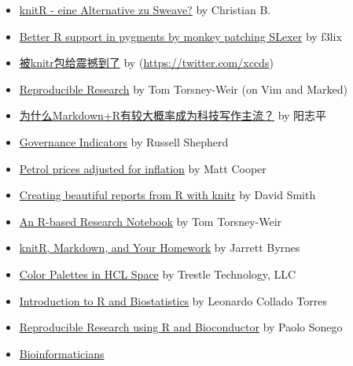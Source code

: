 \documentclass[
]{bxjsreport}
\begin{document}
\begin{itemize}
{  literate programming with R} by Christophe Lalanne
\item
  \href{http://www.blogofolio.de/2012/05/knitr-eine-alternative-zu-sweave/}{knitR
  - eine Alternative zu Sweave?} by Christian B.
\item
  \href{http://blog.felixriedel.com/2012/05/better-r-support-in-pygments-by-monkey-patching-slexer/}{Better
  R support in pygments by monkey patching SLexer} by f3lix
\item
  \href{http://xccds1977.blogspot.com/2012/05/knitr.html}{被knitr包给震撼到了}
  by \autocite{xccds}(\url{https://twitter.com/xccds})
\item
  \href{http://torsneyt.wordpress.com/2012/05/19/reproducible-research/}{Reproducible
  Research} by Tom Torsney-Weir (on Vim and Marked)
\item
  \href{http://www.yangzhiping.com/tech/r-markdown-knitr.html}{为什么Markdown+R有较大概率成为科技写作主流？}
  by 阳志平
\item
  \href{http://www.russellshepherd.com/d/?q=blog/governance-indicators}{Governance
  Indicators} by Russell Shepherd
\item
  \href{http://mcfromnz.wordpress.com/2012/07/28/petrol-prices-adjusted-for-inflation/}{Petrol
  prices adjusted for inflation} by Matt Cooper
\item
  \href{http://blog.revolutionanalytics.com/2012/08/creating-beautiful-reports-from-r-with-knitr.html}{Creating
  beautiful reports from R with knitr} by David Smith
\item
  \href{http://www.tomtorsneyweir.com/research-notebook/}{An R-based
  Research Notebook} by Tom Torsney-Weir
\item
  \href{http://learningdata.wordpress.com/2012/09/30/knitr-markdown-and-your-homework/}{knitR,
  Markdown, and Your Homework} by Jarrett Byrnes
\item
  \href{http://www.trestletechnology.net/2012/10/color-palettes-in-hcl-space/}{Color
  Palettes in HCL Space} by Trestle Technology, LLC
\item
  \href{http://fellgernon.tumblr.com/post/35587597245/introduction-to-r-and-biostatistics-2012-version}{Introduction
  to R and Biostatistics} by Leonardo Collado Torres
\item
  \href{http://onertipaday.blogspot.com/2012/12/italian-bio-r-day-2012-slides-on.html}{Reproducible
  Research using R and Bioconductor} by Paolo Sonego
\item
  \href{http://reasoniamhere.com/bioinformaticians-need-lab-notebooks-too/}{Bioinformaticians
}
\end{itemize}
\end{document}
